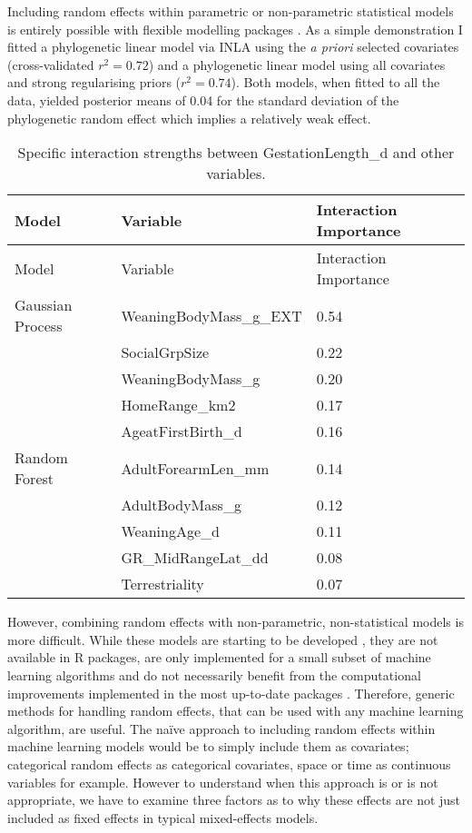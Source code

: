\documentclass[10pt,]{article}
\begin{document}
Including random effects within parametric or non-parametric statistical models is entirely possible with flexible modelling packages \citep{stan, INLA, glmmTMB, tmb}.
As a simple demonstration I fitted a phylogenetic linear model via INLA \citep{INLA} using the \emph{a priori} selected covariates (cross-validated \(r^2 = 0.72\)) and a phylogenetic linear model using all covariates and strong regularising priors (\(r^2 = 0.74\)).
Both models, when fitted to all the data, yielded posterior means of 0.04 for the standard deviation of the phylogenetic random effect which implies a relatively weak effect.

\begin{table}[t!]
\begin{longtable}[c]{@{}lll@{}}
\caption{Specific interaction strengths between GestationLength\_d and other variables. \label{tbl:specificinter}}\tabularnewline
\toprule
Model & Variable & Interaction Importance\tabularnewline
\midrule
\endfirsthead
\toprule
Model & Variable & Interaction Importance\tabularnewline
\midrule
\endhead
Gaussian Process & WeaningBodyMass\_g\_EXT & 0.54\tabularnewline
& SocialGrpSize & 0.22\tabularnewline
& WeaningBodyMass\_g & 0.20\tabularnewline
& HomeRange\_km2 & 0.17\tabularnewline
& AgeatFirstBirth\_d & 0.16\tabularnewline
Random Forest & AdultForearmLen\_mm & 0.14\tabularnewline
& AdultBodyMass\_g & 0.12\tabularnewline
& WeaningAge\_d & 0.11\tabularnewline
& GR\_MidRangeLat\_dd & 0.08\tabularnewline
& Terrestriality & 0.07\tabularnewline
\bottomrule
\end{longtable}
\end{table}


However, combining random effects with non-parametric, non-statistical models is more difficult.
While these models are starting to be developed \citep{ngufor2019mixed, hajjem2014mixed, hajjem2017generalized, eo2014tree, miller2017gradient, REEMtree}, they are not available in R packages, are only implemented for a small subset of machine learning algorithms and do not necessarily benefit from the computational improvements implemented in the most up-to-date packages \citep{wright2015ranger, xgboost}.
Therefore, generic methods for handling random effects, that can be used with any machine learning algorithm, are useful.
The na\"{i}ve approach to including random effects within machine learning models would be to simply include them as covariates; categorical random effects as categorical covariates, space or time as continuous variables for example.
However to understand when this approach is or is not appropriate, we have to examine three factors as to why these effects are not just included as fixed effects in typical mixed-effects models.
\end{document}
